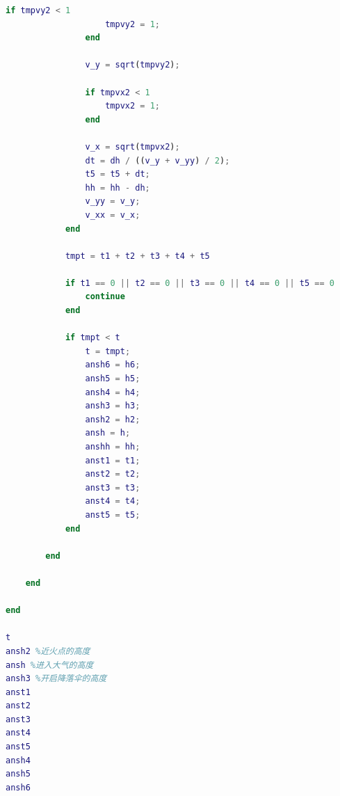 \documentclass[hyperref,a4paper,UTF8]{ctexart}
\begin{document}
\begin{lstlisting}[language=Matlab]
                if tmpvy2 < 1
                    tmpvy2 = 1;
                end

                v_y = sqrt(tmpvy2);

                if tmpvx2 < 1
                    tmpvx2 = 1;
                end

                v_x = sqrt(tmpvx2);
                dt = dh / ((v_y + v_yy) / 2);
                t5 = t5 + dt;
                hh = hh - dh;
                v_yy = v_y;
                v_xx = v_x;
            end

            tmpt = t1 + t2 + t3 + t4 + t5

            if t1 == 0 || t2 == 0 || t3 == 0 || t4 == 0 || t5 == 0
                continue
            end

            if tmpt < t
                t = tmpt;
                ansh6 = h6;
                ansh5 = h5;
                ansh4 = h4;
                ansh3 = h3;
                ansh2 = h2;
                ansh = h;
                anshh = hh;
                anst1 = t1;
                anst2 = t2;
                anst3 = t3;
                anst4 = t4;
                anst5 = t5;
            end

        end

    end

end

t
ansh2 %近火点的高度
ansh %进入大气的高度
ansh3 %开启降落伞的高度
anst1
anst2
anst3
anst4
anst5
ansh4
ansh5
ansh6

\end{lstlisting}
\end{document}
